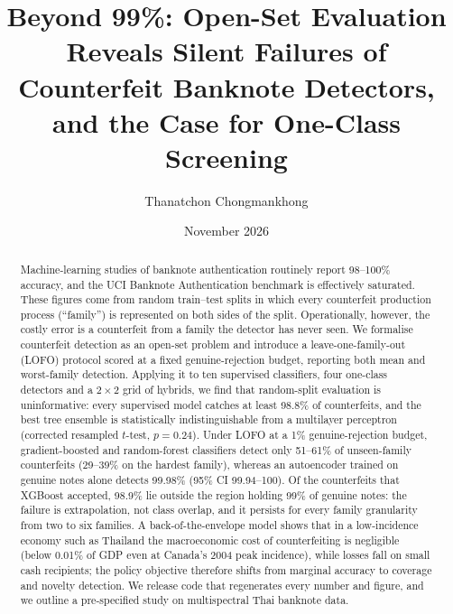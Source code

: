 \documentclass{article}
\title{Beyond 99\%: Open-Set Evaluation Reveals Silent Failures of Counterfeit Banknote Detectors, and the Case for One-Class Screening}
\author{Thanatchon Chongmankhong}
\date{November 2026}
\theoremstyle{definition}
\theoremstyle{remark}
\begin{document}
\raggedbottom
\maketitle

\begin{abstract}
Machine-learning studies of banknote authentication routinely report 98--100\% accuracy, and the UCI Banknote Authentication benchmark is effectively saturated. These figures come from random train--test splits in which every counterfeit production process (``family'') is represented on both sides of the split. Operationally, however, the costly error is a counterfeit from a family the detector has never seen. We formalise counterfeit detection as an open-set problem and introduce a leave-one-family-out (LOFO) protocol scored at a fixed genuine-rejection budget, reporting both mean and worst-family detection. Applying it to ten supervised classifiers, four one-class detectors and a $2\times2$ grid of hybrids, we find that random-split evaluation is uninformative: every supervised model catches at least 98.8\% of counterfeits, and the best tree ensemble is statistically indistinguishable from a multilayer perceptron (corrected resampled $t$-test, $p=0.24$). Under LOFO at a 1\% genuine-rejection budget, gradient-boosted and random-forest classifiers detect only 51--61\% of unseen-family counterfeits (29--39\% on the hardest family), whereas an autoencoder trained on genuine notes alone detects 99.98\% (95\% CI 99.94--100). Of the counterfeits that XGBoost accepted, 98.9\% lie outside the region holding 99\% of genuine notes: the failure is extrapolation, not class overlap, and it persists for every family granularity from two to six families. A back-of-the-envelope model shows that in a low-incidence economy such as Thailand the macroeconomic cost of counterfeiting is negligible (below 0.01\% of GDP even at Canada's 2004 peak incidence), while losses fall on small cash recipients; the policy objective therefore shifts from marginal accuracy to coverage and novelty detection. We release code that regenerates every number and figure, and we outline a pre-specified study on multispectral Thai banknote data.
\end{abstract}

\end{document}
